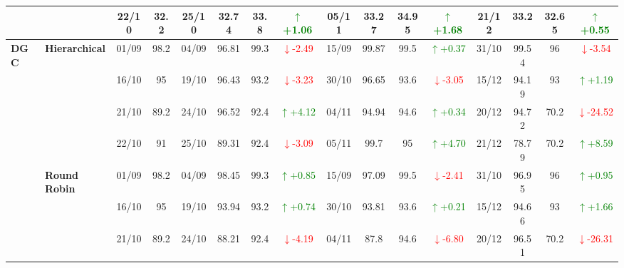{\begin{longtable}{llcc|cccc|cccc|cccc}
&
& 22/10 & 32.2 & 25/10 & 32.74 & 33.8 & \textcolor{green}{\(\uparrow\)+1.06} & 05/11 & 33.27 & 34.95 & \textcolor{green}{\(\uparrow\)+1.68} & 21/12 & 33.2 & 32.65 & \textcolor{green}{\(\uparrow\)+0.55} \\
\midrule




\multirow{12}{*}{\textbf{DGC}} 
& \textbf{Hierarchical}
& 01/09 & 98.2 & 04/09 & 96.81 & 99.3 & \textcolor{red}{\(\downarrow\)-2.49} & 15/09 & 99.87 & 99.5 & \textcolor{green}{\(\uparrow\)+0.37} & 31/10 & 99.54 & 96 & \textcolor{red}{\(\downarrow\)-3.54} \\

&
& 16/10 & 95 & 19/10 & 96.43 & 93.2 & \textcolor{red}{\(\downarrow\)-3.23} & 30/10 & 96.65 & 93.6 & \textcolor{red}{\(\downarrow\)-3.05} & 15/12 & 94.19 & 93 & \textcolor{green}{\(\uparrow\)+1.19} \\

&
& 21/10 & 89.2 & 24/10 & 96.52 & 92.4 & \textcolor{green}{\(\uparrow\)+4.12} & 04/11 & 94.94 & 94.6 & \textcolor{green}{\(\uparrow\)+0.34} & 20/12 & 94.72 & 70.2 & \textcolor{red}{\(\downarrow\)-24.52} \\

&
& 22/10 & 91 & 25/10 & 89.31 & 92.4 & \textcolor{red}{\(\downarrow\)-3.09} & 05/11 & 99.7 & 95 & \textcolor{green}{\(\uparrow\)+4.70} & 21/12 & 78.79 & 70.2 & \textcolor{green}{\(\uparrow\)+8.59} \\
\cmidrule(lr){2-16}


& \textbf{Round Robin}
& 01/09 & 98.2 & 04/09 & 98.45 & 99.3 & \textcolor{green}{\(\uparrow\)+0.85} & 15/09 & 97.09 & 99.5 & \textcolor{red}{\(\downarrow\)-2.41} & 31/10 & 96.95 & 96 & \textcolor{green}{\(\uparrow\)+0.95} \\

&
& 16/10 & 95 & 19/10 & 93.94 & 93.2 & \textcolor{green}{\(\uparrow\)+0.74} & 30/10 & 93.81 & 93.6 & \textcolor{green}{\(\uparrow\)+0.21} & 15/12 & 94.66 & 93 & \textcolor{green}{\(\uparrow\)+1.66} \\

&
& 21/10 & 89.2 & 24/10 & 88.21 & 92.4 & \textcolor{red}{\(\downarrow\)-4.19} & 04/11 & 87.8 & 94.6 & \textcolor{red}{\(\downarrow\)-6.80} & 20/12 & 96.51 & 70.2 & \textcolor{red}{\(\downarrow\)-26.31} \\


\end{longtable}}
